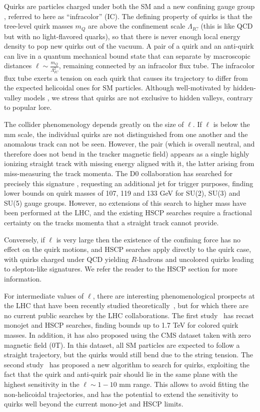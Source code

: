 Quirks are particles charged under both the SM and a new confining gauge group \cite{Kang:2008ea}, referred to here as ``infracolor'' (IC). The defining property of quirks is that the tree-level quirk masses $m_Q$ are above the confinement scale $\Lambda_{IC}$ (this is like QCD but with no light-flavored quarks), so that there is never enough local energy density to pop new quirks out of the vacuum.  A pair of a quirk and an anti-quirk can live in a quantum mechanical bound state that can separate by macroscopic distances $\ell \sim \frac{m_Q}{\Lambda_{IC}^2}$, remaining connected by an infracolor flux tube. The infracolor flux tube exerts a tension on each quirk that causes its trajectory to differ from the expected helicoidal ones for SM particles. Although well-motivated by hidden-valley models \cite{Strassler:2006im}, we stress that quirks are not exclusive to hidden valleys, contrary to popular lore.

The collider phenomenology depends greatly on the size of $\ell$.  If $\ell$ is below the mm scale, the individual quirks are not distinguished from one another and the anomalous track can not be seen. However, the pair (which is overall neutral, and therefore does not bend in the tracker magnetic field) appears as a single highly ionizing straight track with missing energy aligned with it, the latter arising from miss-measuring the track momenta.
The D0 collaboration has searched for precisely this signature \cite{Abazov:2010yb}, requesting an additional jet for trigger purposes, finding lower bounds on quirk masses of 107, 119 and 133 GeV for SU(2), SU(3) and SU(5) gauge groups. However, no extensions of this search to higher mass have been performed at the LHC, and the existing HSCP searches require a fractional certainty on the tracks momenta that a straight track cannot provide.

Conversely, if $\ell$ is very large then the existence of the confining force has no effect on the quirk motions, and HSCP searches  apply directly to the quirk case, with quirks charged under QCD yielding $R$-hadrons and uncolored quirks leading to slepton-like signatures. We refer the reader to the HSCP section for more information.

For intermediate values of $\ell$, there are interesting phenomenological prospects at the LHC that have been recently studied theoretically~\cite{Farina:2017cts,Knapen:2017kly}, but for which there are no current public searches by the LHC collaborations. The first study~\cite{Farina:2017cts} has recast monojet and HSCP searches, finding bounds up to 1.7 TeV for colored quirk masses. In addition, it has also proposed using the CMS dataset taken with zero magnetic field (0T). In this dataset, all SM particles are expected to follow a straight trajectory, but the quirks would still bend due to the string tension. The second study~\cite{Knapen:2017kly} has proposed a new algorithm to search for quirks, exploiting the fact that the quirk and anti-quirk pair should lie in the same plane with the highest sensitivity in the $\ell \sim 1-10$ mm range. This allows to avoid fitting the non-helicoidal trajectories, and has the potential to extend the sensitivity to quirks well beyond the current mono-jet and HSCP limits.

